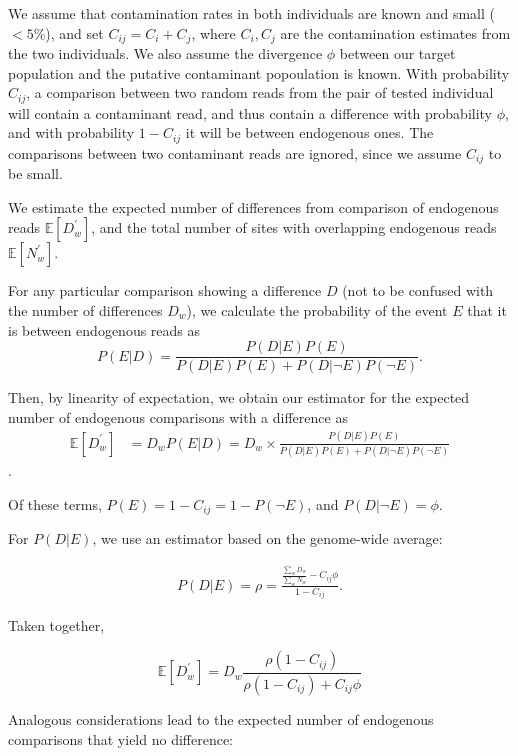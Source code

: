 \documentclass[12pt, letterpaper]{article}
\begin{document}
We assume that contamination rates in both individuals are known and small ($<5\%$), and set $C_{ij} = C_i + C_j$, where $C_i, C_j$ are the contamination estimates from the two individuals. We also assume the divergence $\phi$ between our
target population and the putative contaminant popoulation is known. With probability $C_{ij}$, a comparison between two random reads from the pair of tested individual will contain a contaminant read, and thus contain a difference with probability $\phi$, and with probability $1 - C_{ij}$ it will be between endogenous ones. The comparisons between two contaminant reads are ignored, since we assume $C_{ij}$ to be small.

We  estimate the expected number of differences from comparison of endogenous reads $\mathbb{E}[D_w^{'}]$, and the total number of sites with overlapping endogenous reads $\mathbb{E}[N_w^{'}]$.

For any particular comparison showing a difference $D$ (not to be confused with the number of differences $D_w$), we calculate the probability of the event $E$ that it is between endogenous reads as
\begin{equation}
    P(E|D) = \frac{P(D|E)P(E)}{P(D|E)P(E) + P(D| \neg E)P( \neg E)}.
\end{equation}

Then, by linearity of expectation, we obtain our estimator for the expected number of endogenous comparisons with a difference as
\begin{align}
    \mathbb{E}[D_w^{'}] &= D_{w} P(E|D) = D_{w} \times \frac{P(D|E)P(E)}{P(D|E)P(E) + P(D| \neg E)P( \neg E)}
\end{align}.

Of these terms, $P(E)= 1 -C_{ij} = 1 - P(\neg E)$, and $P(D| \neg E) = \phi$.

For $P(D|E)$, we use an estimator based on the genome-wide average:

\begin{align}
    P(D|E) = \rho = \frac{\frac{\sum_w D_w}{\sum_w N_w} - C_{ij} \phi}{1 - C_{ij}}.
\end{align}

Taken together,

\begin{equation}
 \mathbb{E}[D_w^{'}]= D_{w}\frac{\rho (1-C_{ij})}{\rho(1-C_{ij}) + C_{ij}\phi}
 \end{equation}

 Analogous considerations lead to the expected number of endogenous comparisons that yield no difference:
\end{document}
